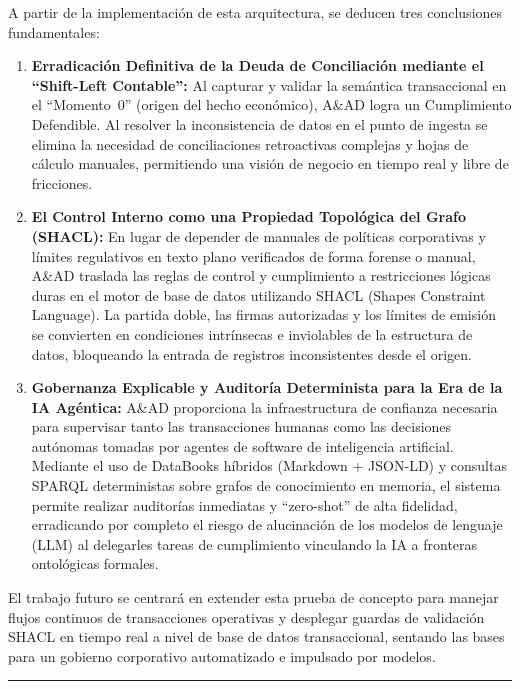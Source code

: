 \documentclass[12pt, a4paper]{article}
\begin{document}
A partir de la implementación de esta arquitectura, se deducen tres conclusiones fundamentales:

\begin{enumerate}
\item \textbf{Erradicación Definitiva de la Deuda de Conciliación mediante el ``Shift-Left Contable'':} Al capturar y validar la semántica transaccional en el ``Momento~0'' (origen del hecho económico), A\&AD logra un Cumplimiento Defendible. Al resolver la inconsistencia de datos en el punto de ingesta se elimina la necesidad de conciliaciones retroactivas complejas y hojas de cálculo manuales, permitiendo una visión de negocio en tiempo real y libre de fricciones.

\item \textbf{El Control Interno como una Propiedad Topológica del Grafo (SHACL):} En lugar de depender de manuales de políticas corporativas y límites regulativos en texto plano verificados de forma forense o manual, A\&AD traslada las reglas de control y cumplimiento a restricciones lógicas duras en el motor de base de datos utilizando SHACL (Shapes Constraint Language). La partida doble, las firmas autorizadas y los límites de emisión se convierten en condiciones intrínsecas e inviolables de la estructura de datos, bloqueando la entrada de registros inconsistentes desde el origen.

\item \textbf{Gobernanza Explicable y Auditoría Determinista para la Era de la IA Agéntica:} A\&AD proporciona la infraestructura de confianza necesaria para supervisar tanto las transacciones humanas como las decisiones autónomas tomadas por agentes de software de inteligencia artificial. Mediante el uso de DataBooks híbridos (Markdown + JSON-LD) y consultas SPARQL deterministas sobre grafos de conocimiento en memoria, el sistema permite realizar auditorías inmediatas y ``zero-shot'' de alta fidelidad, erradicando por completo el riesgo de alucinación de los modelos de lenguaje (LLM) al delegarles tareas de cumplimiento vinculando la IA a fronteras ontológicas formales.
\end{enumerate}

El trabajo futuro se centrará en extender esta prueba de concepto para manejar flujos continuos de transacciones operativas y desplegar guardas de validación SHACL en tiempo real a nivel de base de datos transaccional, sentando las bases para un gobierno corporativo automatizado e impulsado por modelos.

\hrule
\vspace{1em}
\end{document}
